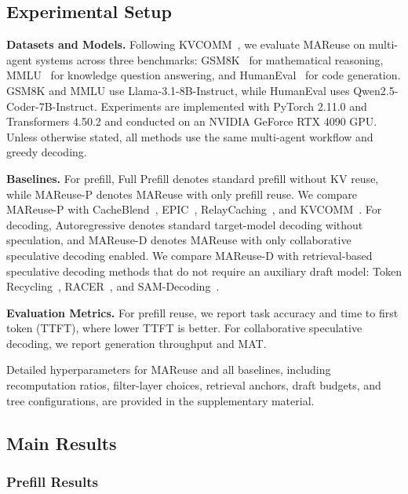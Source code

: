 \documentclass[letterpaper]{article} %
\begin{document}
\subsection{Experimental Setup}

\textbf{Datasets and Models.}
Following KVCOMM~\citep{ye2025kvcomm}, we evaluate MAReuse on multi-agent systems across three benchmarks: GSM8K~\citep{cobbe2021training} for mathematical reasoning, MMLU~\citep{hendrycks2021measuring} for knowledge question answering, and HumanEval~\citep{chen2021evaluating} for code generation. GSM8K and MMLU use Llama-3.1-8B-Instruct, while HumanEval uses Qwen2.5-Coder-7B-Instruct. Experiments are implemented with PyTorch 2.11.0 and Transformers 4.50.2 and conducted on an NVIDIA GeForce RTX 4090 GPU. Unless otherwise stated, all methods use the same multi-agent workflow and greedy decoding.

\noindent\textbf{Baselines.}
For prefill, Full Prefill denotes standard prefill without KV reuse, while MAReuse-P denotes MAReuse with only prefill reuse. We compare MAReuse-P with CacheBlend~\citep{yao2025cacheblend}, EPIC~\citep{hu2025epic}, RelayCaching~\citep{geng2026relaycaching}, and KVCOMM~\citep{ye2025kvcomm}. For decoding, Autoregressive denotes standard target-model decoding without speculation, and MAReuse-D denotes MAReuse with only collaborative speculative decoding enabled. We compare MAReuse-D with retrieval-based speculative decoding methods that do not require an auxiliary draft model: Token Recycling~\citep{luo2025tokenrecycling}, RACER~\citep{zhang2026racer}, and SAM-Decoding~\citep{hu2025sam}.

\noindent\textbf{Evaluation Metrics.}
For prefill reuse, we report task accuracy and time to first token (TTFT), where lower TTFT is better. For collaborative speculative decoding, we report generation throughput and MAT.

Detailed hyperparameters for MAReuse and all baselines, including recomputation ratios, filter-layer choices, retrieval anchors, draft budgets, and tree configurations, are provided in the supplementary material.

\subsection{Main Results}

\subsubsection{Prefill Results}
\end{document}
